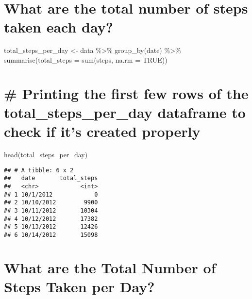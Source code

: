 \documentclass[
]{article}
\newenvironment{Shaded}{\begin{snugshade}}{\end{snugshade}}
\newcommand{\AttributeTok}[1]{\textcolor[rgb]{0.77,0.63,0.00}{#1}}
\newcommand{\ConstantTok}[1]{\textcolor[rgb]{0.00,0.00,0.00}{#1}}
\newcommand{\FunctionTok}[1]{\textcolor[rgb]{0.00,0.00,0.00}{#1}}
\newcommand{\NormalTok}[1]{#1}
\newcommand{\OtherTok}[1]{\textcolor[rgb]{0.56,0.35,0.01}{#1}}
\newcommand{\SpecialCharTok}[1]{\textcolor[rgb]{0.00,0.00,0.00}{#1}}
\begin{document}
\hypertarget{what-are-the-total-number-of-steps-taken-each-day}{%
\section{What are the total number of steps taken each
day?}\label{what-are-the-total-number-of-steps-taken-each-day}}

\begin{Shaded}
\begin{Highlighting}[]
\NormalTok{total\_steps\_per\_day }\OtherTok{\textless{}{-}}\NormalTok{ data }\SpecialCharTok{\%\textgreater{}\%} 
  \FunctionTok{group\_by}\NormalTok{(date) }\SpecialCharTok{\%\textgreater{}\%} 
  \FunctionTok{summarise}\NormalTok{(}\AttributeTok{total\_steps =} \FunctionTok{sum}\NormalTok{(steps, }\AttributeTok{na.rm =} \ConstantTok{TRUE}\NormalTok{))}
\end{Highlighting}
\end{Shaded}

\hypertarget{printing-the-first-few-rows-of-the-total_steps_per_day-dataframe-to-check-if-its-created-properly}{%
\section{\# Printing the first few rows of the total\_steps\_per\_day
dataframe to check if it's created
properly}\label{printing-the-first-few-rows-of-the-total_steps_per_day-dataframe-to-check-if-its-created-properly}}

\begin{Shaded}
\begin{Highlighting}[]
\FunctionTok{head}\NormalTok{(total\_steps\_per\_day)}
\end{Highlighting}
\end{Shaded}

\begin{verbatim}
## # A tibble: 6 x 2
##   date       total_steps
##   <chr>            <int>
## 1 10/1/2012            0
## 2 10/10/2012        9900
## 3 10/11/2012       10304
## 4 10/12/2012       17382
## 5 10/13/2012       12426
## 6 10/14/2012       15098
\end{verbatim}

\hypertarget{what-are-the-total-number-of-steps-taken-per-day}{%
\section{What are the Total Number of Steps Taken per
Day?}\label{what-are-the-total-number-of-steps-taken-per-day}}
\end{document}
